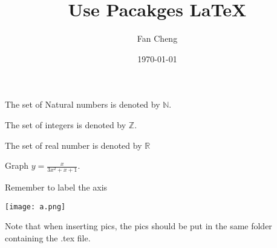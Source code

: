 \documentclass[11pt]{article}
\def\eq1{y=\displaystyle{\frac{x}{3x^2+x+1}}}
\def\sometext{Remember to label the axis}
\begin{document}
\title{Use Pacakges \LaTeX}
\author{Fan Cheng}
\date{\today}
\maketitle

The set of Natural numbers is denoted by $\mathbb{N}$. 

The set of integers is denoted by $\mathbb{Z}$. 

The set of real number is denoted by $\mathbb{R}$

Graph $\eq1$.

\sometext

\begin{center}
\texttt{[image: a.png]}
\end{center}

Note that when inserting pics, the pics should be put in the same folder containing the .tex file.
\end{document}
